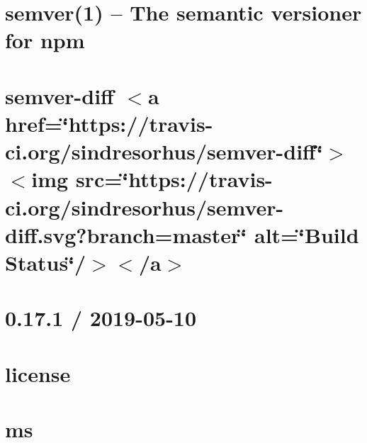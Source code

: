 \let\mypdfximage\pdfximage\def\pdfximage{\immediate\mypdfximage}\documentclass[twoside]{book}
\newcommand{\+}{\discretionary{\mbox{\scriptsize$\hookleftarrow$}}{}{}}
\begin{document}
\chapter{semver(1) -- The semantic versioner for npm}
\label{md__c_1__git_hub__p_r_o_y_e_c_t_o-_i_i_i-_g_o_t_rest-api_node_modules_semver-diff_node_modules_semver__r_e_a_d_m_e}

\chapter{semver-\/diff $<$a href=\char`\"{}https\+://travis-\/ci.\+org/sindresorhus/semver-\/diff\char`\"{}$>$$<$img src=\char`\"{}https\+://travis-\/ci.\+org/sindresorhus/semver-\/diff.\+svg?branch=master\char`\"{} alt=\char`\"{}\+Build Status\char`\"{}/$>$$<$/a$>$}
\label{md__c_1__git_hub__p_r_o_y_e_c_t_o-_i_i_i-_g_o_t_rest-api_node_modules_semver-diff_readme}

\chapter{0.17.1 / 2019-\/05-\/10}
\label{md__c_1__git_hub__p_r_o_y_e_c_t_o-_i_i_i-_g_o_t_rest-api_node_modules_send__h_i_s_t_o_r_y}

\chapter{license}
\label{md__c_1__git_hub__p_r_o_y_e_c_t_o-_i_i_i-_g_o_t_rest-api_node_modules_send_node_modules_ms_license}

\chapter{ms}
\label{md__c_1__git_hub__p_r_o_y_e_c_t_o-_i_i_i-_g_o_t_rest-api_node_modules_send_node_modules_ms_readme}

\end{document}
